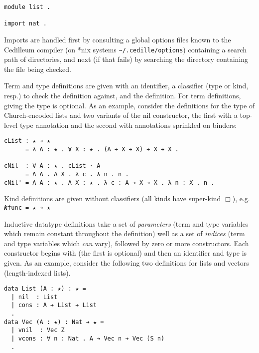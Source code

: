 \documentclass{article}
\begin{document}
\begin{verbatim}
module list .

import nat .
\end{verbatim}

\noindent Imports are handled first by consulting a global options files
known to the Cedilleum compiler (on *nix systems \verb|~/.cedille/options|)
containing a search path of directories, and next (if that fails) by searching
the directory containing the file being checked.

Term and type definitions are given with an identifier, a classifier (type or
kind, resp.) to check the definition against, and the definition. For term
definitions, giving the type is optional. As an example, consider the
definitions for the type of Church-encoded lists and two variants of the nil
constructor, the first with a top-level type annotation and the second with
annotations sprinkled on binders:

\begin{verbatim}
cList : ★ ➔ ★
      = λ A : ★ . ∀ X : ★ . (A ➔ X ➔ X) ➔ X ➔ X .

cNil  : ∀ A : ★ . cList · A
      = Λ A . Λ X . λ c . λ n . n .
cNil' = Λ A : ★ . Λ X : ★ . λ c : A ➔ X ➔ X . λ n : X . n .
\end{verbatim}

Kind definitions are given without classifiers (all kinds have super-kind
$\Box$), e.g. \verb;𝒌func = ★ ➔ ★;

Inductive datatype definitions take a set of \textit{parameters} (term and type
variables which remain constant throughout the definition) well as a set of
\textit{indices} (term and type variables which \textit{can} vary), followed by
zero or more constructors. Each constructor begins with \textbf{\textbar} (the
first is optional) and then an identifier and type is given. As an example,
consider the following two definitions for lists and vectors (length-indexed
lists).

\begin{verbatim}
data List (A : ★) : ★ =
  | nil  : List
  | cons : A ➔ List ➔ List
  .
data Vec (A : ★) : Nat ➔ ★ =
  | vnil  : Vec Z
  | vcons : ∀ n : Nat . A ➔ Vec n ➔ Vec (S n)
  .
\end{verbatim}
\end{document}
